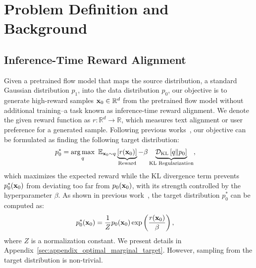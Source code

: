 \vspace{-0.5\baselineskip}
\section{Problem Definition and Background}
\vspace{-0.6\baselineskip}

\subsection{Inference-Time Reward Alignment}
\vspace{-0.4\baselineskip}
\label{sec:problem_definition}
Given a pretrained flow model that maps the source distribution, a standard Gaussian distribution $p_1$, into the data distribution $p_0$, our objective is to generate high-reward samples $\mathbf{x}_0 \in \mathbb{R}^d$ from the pretrained flow model without additional training--a task known as inference-time reward alignment. We denote the given reward function as $r: \mathbb{R}^{d} \rightarrow \mathbb{R}$, 
which measures text alignment or user preference for a generated sample. 
Following previous works~\cite{Korbak:2022RLDM,Uehara:2024Finetuning,Uehara:2024Bridging}, our objective can be formulated as finding the following target distribution:
{\small
    \begin{align}
        \label{eq:reward_max_obj}
        p^{*}_0 &= \operatorname*{arg\,max}_{q} \  \mathbb{E}_{\mathbf{x}_0 \sim q} \underbrace{\left[ r(\mathbf{x}_0) \right]}_{\text{Reward}} -\beta \underbrace{\mathcal{D}_{\text{KL}} \left[ q \| p_0 \right]}_{\text{KL Regularization}},
    \end{align}
}%
which maximizes the expected reward while the KL divergence term prevents $p^{*}_0(\mathbf{x}_0)$ from deviating too far from $p_0(\mathbf{x}_0)$, with its strength controlled by the hyperparameter $\beta$. 
As shown in previous work~\cite{Rafailov2023:DPO}, the target distribution $p^{*}_0$ can be computed as:
{\small
\begin{align}
    \label{eq:target_distribution}
    p^{*}_0(\mathbf{x}_0) &= \frac{1}{Z} p_0(\mathbf{x}_0) \exp \left( \frac{r(\mathbf{x}_0)}{\beta} \right),
\end{align}
}%
where $Z$ is a normalization constant. We present details in Appendix~\ref{sec:appendix_optimal_marginal_target}. However, sampling from the target distribution is non-trivial. 

